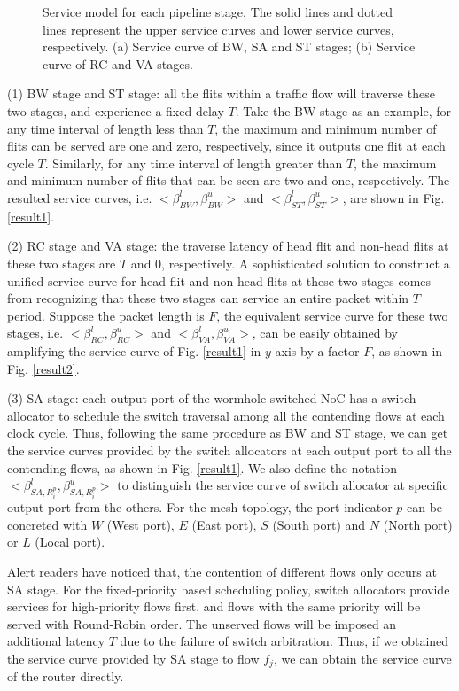\documentclass[10pt,journal]{IEEEtran}
\begin{document}
\begin{figure}
  \caption{Service model for each pipeline stage. The solid lines and dotted lines represent the upper service curves and lower service curves, respectively. (a) Service curve of BW, SA and ST stages; (b) Service curve of RC and VA stages.}
\end{figure}

(1) BW stage and ST stage: all the flits within a traffic flow will traverse these two stages, and experience a fixed delay $T$. Take the BW stage as an example, for any time interval of length less than $T$, the maximum and minimum number of flits can be served are one and zero, respectively, since it outputs one flit at each cycle $T$. Similarly, for any time interval of length greater than $T$, the maximum and minimum number of flits that can be seen are two and one, respectively. The resulted service curves, i.e. $<\beta^l_{BW},\beta^u_{BW}>$ and $<\beta^l_{ST},\beta^u_{ST}>$, are shown in Fig. \ref{result1}.

(2) RC stage and VA stage: the traverse latency of head flit and non-head flits at these two stages are $T$ and 0, respectively. A sophisticated solution to construct a unified service curve for head flit and non-head flits at these two stages comes from recognizing that these two stages can service an entire packet within $T$ period. Suppose the packet length is $F$, the equivalent service curve for these two stages, i.e. $<\beta^l_{RC},\beta^u_{RC}>$ and $<\beta^l_{VA},\beta^u_{VA}>$, can be easily obtained by amplifying the service curve of Fig. \ref{result1} in $y$-axis by a factor $F$, as shown in Fig. \ref{result2}.

(3) SA stage: each output port of the wormhole-switched NoC has a switch allocator to schedule the switch traversal among all the contending flows at each clock cycle. Thus, following the same procedure as BW and ST stage, we can get the service curves provided by the switch allocators at each output port to all the contending flows, as shown in Fig. \ref{result1}. We also define the notation $<\beta_{SA,R_i^{p}}^l,\beta_{SA,R_i^{p}}^u>$ to distinguish the service curve of switch allocator at specific output port from the others. For the mesh topology, the port indicator $p$ can be concreted with $W$ (West port), $E$ (East port), $S$ (South port) and $N$ (North port) or $L$ (Local port).

Alert readers have noticed that, the contention of different flows only occurs at SA stage. For the fixed-priority based scheduling policy, switch allocators provide services for high-priority flows first, and flows with the same priority will be served with Round-Robin order. The unserved flows will be imposed an additional latency $T$ due to the failure of switch arbitration. Thus, if we obtained the service curve provided by SA stage to flow $f_j$, we can obtain the service curve of the router directly.
\end{document}
